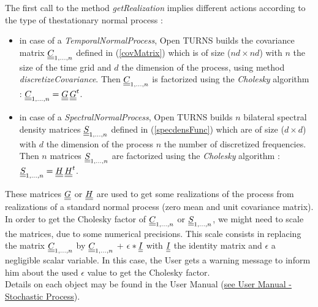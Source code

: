 The first call to the method \emph{getRealization} implies different actions according to the type of thestationary  normal process : 
\begin{itemize}
  \item in case of a {\itshape TemporalNormalProcess}, Open TURNS builds the covariance matrix ${\underline{\underline{C}}}_{1,\dots,n}$ defined in (\ref{covMatrix}) which is of size  ($nd \times nd$) with $n$ the size of the time grid and $d$ the dimension of the process, using  method \emph{discretizeCovariance}. Then ${\underline{\underline{C}}}_{1,\dots,n}$ is factorized using the \emph{Cholesky} algorithm :  ${\underline{\underline{C}}}_{1,\dots,n} = {\underline{\underline{G}}} \, {\underline{\underline{G}}}^{t}$. 
  \item in case of a {\itshape SpectralNormalProcess}, Open TURNS builds $n$ bilateral spectral density matrices ${\underline{\underline{S}}}_{1,\dots,n}$ defined in (\ref{specdensFunc}) which are of size  ($d \times d$) with  $d$ the dimension of the process $n$ the number of discretized frequencies. Then $n$ matrices ${\underline{\underline{S}}}_{1,\dots,n}$ are factorized using the \emph{Cholesky} algorithm :  ${\underline{\underline{S}}}_{1,\dots,n} = {\underline{\underline{H}}} \, {\underline{\underline{H}}}^{t}$.
\end{itemize}
These matrices ${\underline{\underline{G}}}$ or ${\underline{\underline{H}}}$ are used to get some realizations of the process from realizations of a standard normal process (zero mean and unit covariance matrix). \\

In order to get the Cholesky factor of ${\underline{\underline{C}}}_{1,\dots,n}$ or ${\underline{\underline{S}}}_{1,\dots,n}$, we might need to scale the matrices, due to some numerical precisions. 
This scale consists in replacing the matrix ${\underline{\underline{C}}}_{1,\dots,n}$ by 
${\underline{\underline{C}}}_{1,\dots,n}$ + $\epsilon * {\underline{\underline{I}}}$ with  ${\underline{\underline{I}}}$ the identity matrix and $\epsilon$ a negligible scalar variable. 
In this case, the User gets a warning message to inform him about the used $\epsilon$ value to get the Cholesky factor.\\

Details on each object may be found in the User Manual  (\href{OpenTURNS_UserManual_TUI.pdf}{see User Manual - Stochastic Process}).\\

